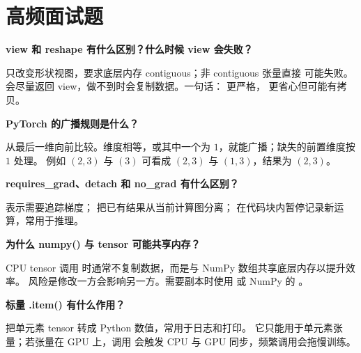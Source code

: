 \section{高频面试题}
\begin{interview}
\textbf{view 和 reshape 有什么区别？什么时候 view 会失败？}
\end{interview}
\begin{answer}
 只改变形状视图，要求底层内存 contiguous；非 contiguous 张量直接  可能失败。
 会尽量返回 view，做不到时会复制数据。一句话： 更严格， 更省心但可能有拷贝。
\end{answer}
\begin{interview}
\textbf{PyTorch 的广播规则是什么？}
\end{interview}
\begin{answer}
从最后一维向前比较。维度相等，或其中一个为 $1$，就能广播；缺失的前置维度按 $1$ 处理。
例如 $(2,3)$ 与 $(3)$ 可看成 $(2,3)$ 与 $(1,3)$，结果为 $(2,3)$。
\end{answer}
\begin{interview}
\textbf{requires\_grad、detach 和 no\_grad 有什么区别？}
\end{interview}
\begin{answer}
 表示需要追踪梯度； 把已有结果从当前计算图分离；
 在代码块内暂停记录新运算，常用于推理。
\end{answer}
\begin{interview}
\textbf{为什么 numpy() 与 tensor 可能共享内存？}
\end{interview}
\begin{answer}
CPU tensor 调用  时通常不复制数据，而是与 NumPy 数组共享底层内存以提升效率。
风险是修改一方会影响另一方。需要副本时使用  或 NumPy 的 。
\end{answer}
\begin{interview}
\textbf{标量 .item() 有什么作用？}
\end{interview}
\begin{answer}
 把单元素 tensor 转成 Python 数值，常用于日志和打印。
它只能用于单元素张量；若张量在 GPU 上，调用  会触发 CPU 与 GPU 同步，频繁调用会拖慢训练。
\end{answer}
